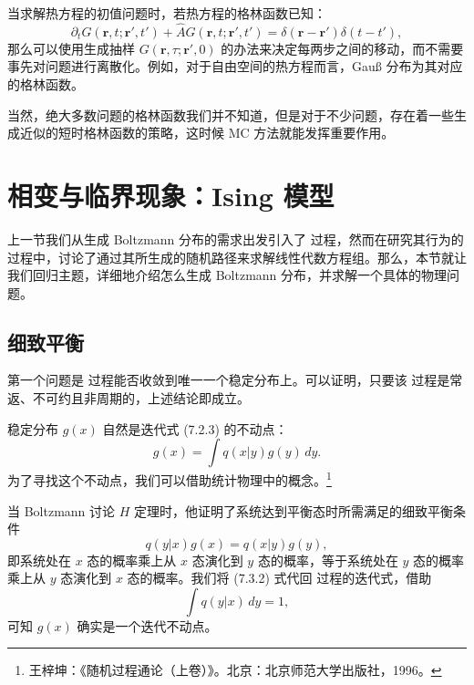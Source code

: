 当求解热方程的初值问题时，若热方程的格林函数已知：
\begin{equation}
 \partial_tG(\bm r,t;\bm r',t')+\hat A G(\bm r,t;\bm r',t')
 =\delta(\bm r-\bm r')\delta(t-t'),
\tag{7.2.32}
\end{equation}
那么可以使用生成抽样 $G(\bm r,\tau;\bm r',0)$ 的办法来决定每两步之间的移动，而不需要事先对问题进行离散化。例如，对于自由空间的热方程而言，Gauß 分布为其对应的格林函数。

当然，绝大多数问题的格林函数我们并不知道，但是对于不少问题，存在着一些生成近似的短时格林函数的策略，这时候 MC 方法就能发挥重要作用。

\section{相变与临界现象：Ising 模型}

上一节我们从生成 Boltzmann 分布的需求出发引入了  过程，然而在研究其行为的过程中，讨论了通过其所生成的随机路径来求解线性代数方程组。那么，本节就让我们回归主题，详细地介绍怎么生成 Boltzmann 分布，并求解一个具体的物理问题。

\subsection{细致平衡}

第一个问题是  过程能否收敛到唯一一个稳定分布上。可以证明，只要该  过程是常返、不可约且非周期的，上述结论即成立。

稳定分布 $g(x)$ 自然是迭代式 (7.2.3) 的不动点：
\begin{equation}
 g(x)=\int q(x|y)g(y)\,dy.
\tag{7.3.1}
\end{equation}
为了寻找这个不动点，我们可以借助统计物理中的概念。\footnote{王梓坤：《随机过程通论（上卷）》。北京：北京师范大学出版社，1996。}

当 Boltzmann 讨论 $H$ 定理时，他证明了系统达到平衡态时所需满足的细致平衡条件
\begin{equation}
 q(y|x)g(x)=q(x|y)g(y),
\tag{7.3.2}
\end{equation}
即系统处在 $x$ 态的概率乘上从 $x$ 态演化到 $y$ 态的概率，等于系统处在 $y$ 态的概率乘上从 $y$ 态演化到 $x$ 态的概率。我们将 (7.3.2) 式代回  过程的迭代式，借助
\begin{equation}
 \int q(y|x)\,dy=1,
\tag{7.3.3}
\end{equation}
可知 $g(x)$ 确实是一个迭代不动点。

